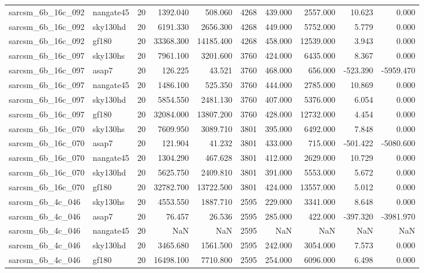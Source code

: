 \begin{tabular}{llrrrrrrrr}
sarcsm\_6b\_16c\_092 & nangate45 & 20 & 1392.040 & 508.060 & 4268 & 439.000 & 2557.000 & 10.623 & 0.000 \\
sarcsm\_6b\_16c\_092 & sky130hd & 20 & 6191.330 & 2656.300 & 4268 & 449.000 & 5752.000 & 5.779 & 0.000 \\
sarcsm\_6b\_16c\_092 & gf180 & 20 & 33368.300 & 14185.400 & 4268 & 458.000 & 12539.000 & 3.943 & 0.000 \\
sarcsm\_6b\_16c\_097 & sky130hs & 20 & 7961.100 & 3201.600 & 3760 & 424.000 & 6435.000 & 8.367 & 0.000 \\
sarcsm\_6b\_16c\_097 & asap7 & 20 & 126.225 & 43.521 & 3760 & 468.000 & 656.000 & -523.390 & -5959.470 \\
sarcsm\_6b\_16c\_097 & nangate45 & 20 & 1486.100 & 525.350 & 3760 & 444.000 & 2785.000 & 10.869 & 0.000 \\
sarcsm\_6b\_16c\_097 & sky130hd & 20 & 5854.550 & 2481.130 & 3760 & 407.000 & 5376.000 & 6.054 & 0.000 \\
sarcsm\_6b\_16c\_097 & gf180 & 20 & 32084.000 & 13807.200 & 3760 & 428.000 & 12732.000 & 4.454 & 0.000 \\
sarcsm\_6b\_16c\_070 & sky130hs & 20 & 7609.950 & 3089.710 & 3801 & 395.000 & 6492.000 & 7.848 & 0.000 \\
sarcsm\_6b\_16c\_070 & asap7 & 20 & 121.904 & 41.232 & 3801 & 433.000 & 715.000 & -501.422 & -5080.600 \\
sarcsm\_6b\_16c\_070 & nangate45 & 20 & 1304.290 & 467.628 & 3801 & 412.000 & 2629.000 & 10.729 & 0.000 \\
sarcsm\_6b\_16c\_070 & sky130hd & 20 & 5625.750 & 2409.810 & 3801 & 391.000 & 5553.000 & 5.672 & 0.000 \\
sarcsm\_6b\_16c\_070 & gf180 & 20 & 32782.700 & 13722.500 & 3801 & 424.000 & 13557.000 & 5.012 & 0.000 \\
sarcsm\_6b\_4c\_046 & sky130hs & 20 & 4553.550 & 1887.710 & 2595 & 229.000 & 3341.000 & 8.648 & 0.000 \\
sarcsm\_6b\_4c\_046 & asap7 & 20 & 76.457 & 26.536 & 2595 & 285.000 & 422.000 & -397.320 & -3981.970 \\
sarcsm\_6b\_4c\_046 & nangate45 & 20 & NaN & NaN & 2595 & NaN & NaN & NaN & NaN \\
sarcsm\_6b\_4c\_046 & sky130hd & 20 & 3465.680 & 1561.500 & 2595 & 242.000 & 3054.000 & 7.573 & 0.000 \\
sarcsm\_6b\_4c\_046 & gf180 & 20 & 16498.100 & 7710.800 & 2595 & 254.000 & 6096.000 & 6.498 & 0.000 \\

\end{tabular}
